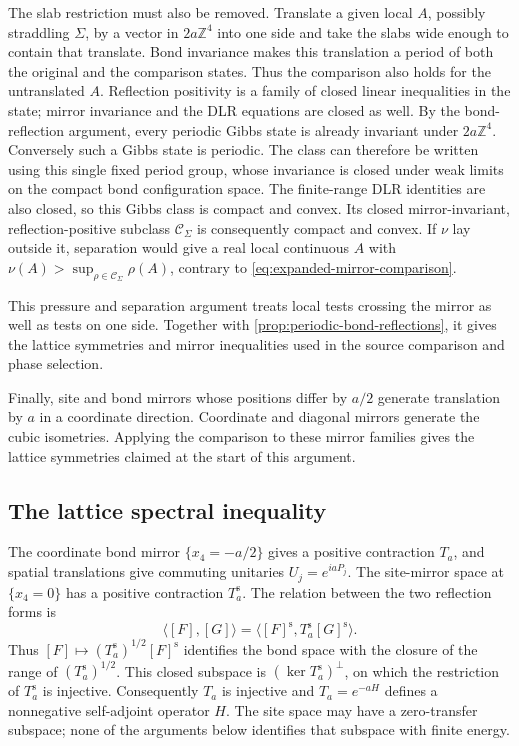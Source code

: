 \documentclass[11pt,letterpaper,reqno]{amsart}
\theoremstyle{definition}
\theoremstyle{remark}
\begin{document}
The slab restriction must also be removed. Translate a given local
$A$, possibly straddling $\Sigma$, by a vector in $2a\mathbb Z^4$
into one side and take the slabs wide enough to contain that
translate. Bond invariance makes this translation a period of both
the original and the comparison states. Thus the comparison also
holds for the untranslated $A$. Reflection positivity is a family of
closed linear inequalities in the state; mirror invariance and the
DLR equations are closed as well. By the bond-reflection argument,
every periodic Gibbs state is already invariant under
$2a\mathbb Z^4$. Conversely such a Gibbs state is periodic. The
class can therefore be written using this single fixed period group,
whose invariance is closed under weak limits on the compact bond
configuration space. The finite-range DLR identities are also closed,
so this Gibbs class is compact and convex. Its closed mirror-invariant,
reflection-positive subclass $\mathcal C_\Sigma$ is consequently
compact and convex.
If $\nu$ lay outside it, separation would give a real local
continuous $A$ with
$\nu(A)>\sup_{\rho\in\mathcal C_\Sigma}\rho(A)$, contrary to
\eqref{eq:expanded-mirror-comparison}.

This pressure and separation argument treats local tests crossing
the mirror as well as tests on one side. Together with
\cref{prop:periodic-bond-reflections}, it gives the lattice symmetries
and mirror inequalities used in the source comparison and phase
selection.

Finally, site and bond mirrors whose positions differ by $a/2$
generate translation by $a$ in a coordinate direction. Coordinate
and diagonal mirrors generate the cubic isometries. Applying the
comparison to these mirror families gives the lattice symmetries
claimed at the start of this argument.


\subsection{The lattice spectral inequality}

The coordinate bond mirror
$\{x_4=-a/2\}$ gives a positive contraction $T_a$, and spatial
translations give commuting unitaries $U_j=e^{iaP_j}$.
The site-mirror space at $\{x_4=0\}$ has a
positive contraction $T_a^{\mathrm s}$. The relation between the two
reflection forms is
\[
 \langle[F],[G]\rangle
 =\langle[F]^{\mathrm s},T_a^{\mathrm s}[G]^{\mathrm s}\rangle.
\]
Thus $[F]\mapsto(T_a^{\mathrm s})^{1/2}[F]^{\mathrm s}$ identifies the
bond space with the closure of the range of $(T_a^{\mathrm s})^{1/2}$.
This closed subspace is $(\ker T_a^{\mathrm s})^\perp$, on which the restriction
of $T_a^{\mathrm s}$ is injective. Consequently $T_a$ is injective and
$T_a=e^{-aH}$ defines a nonnegative self-adjoint operator $H$.
The site space may have a zero-transfer subspace; none of the arguments
below identifies that subspace with finite energy.
\end{document}

